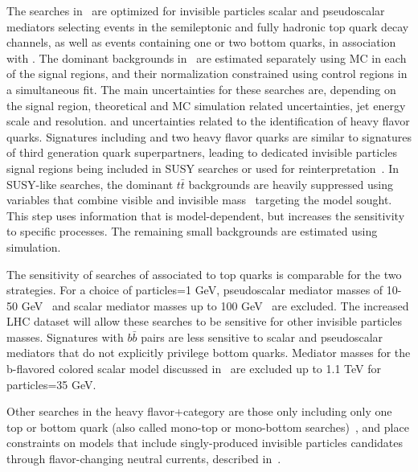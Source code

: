The searches in~\cite{Aaboud:2017rzf,CMS-PAS-EXO-16-051}
are optimized for invisible particles scalar and pseudoscalar mediators
selecting events in the semileptonic and fully hadronic top quark decay channels,
as well as events containing one or two bottom quarks, in association with \MET. 
The dominant backgrounds in~\cite{Aaboud:2017rzf} are estimated separately
using MC in each of the signal regions,
and their normalization constrained using control regions in a simultaneous fit.
The main uncertainties for these searches are, depending on the signal region, 
theoretical and MC simulation related uncertainties, jet energy scale and resolution. 
and uncertainties related to the identification of heavy flavor quarks. 
Signatures including \MET and two heavy flavor quarks are similar to 
signatures of third generation quark superpartners, leading to dedicated
invisible particles signal regions being included in SUSY searches or used
for reinterpretation~\cite{Aaboud:2017aeu,CMS-PAS-SUS-17-001}. 
In SUSY-like searches, the dominant $t\bar{t}$ backgrounds
are heavily suppressed using variables that combine visible and invisible
mass~\cite{Lester:1999tx} targeting the model sought. 
This step uses information that is model-dependent,
but increases the sensitivity to specific processes. The remaining
small backgrounds are estimated using simulation. 

The sensitivity of searches of \MET associated to top quarks
is comparable for the two strategies. 
For a choice of \minvisible particles=1 GeV, pseudoscalar mediator masses of 10-50
GeV~\cite{AAaboud:2017aeu} and scalar mediator masses up to 100
GeV~\cite{CMS-PAS-SUS-17-001} are excluded. 
The increased LHC dataset 
will allow these searches to be sensitive for other invisible particles masses. 
Signatures with $b\bar{b}$ pairs are less sensitive to
scalar and pseudoscalar mediators that do not explicitly
privilege bottom quarks. Mediator masses for the b-flavored colored scalar 
model discussed in~\cite{Agrawal:2014una} are excluded up to 1.1 TeV
for \minvisible particles=35 GeV. 

Other searches in the heavy flavor+\MET category are those only
including only one top or bottom quark
(also called mono-top or mono-bottom searches)~\cite{CMS-PAS-EXO-16-051, Aad:2014wza},
and place constraints on models that include singly-produced invisible particles candidates
through flavor-changing neutral currents, described in~\cite{Boucheneb:2014wza}. 

